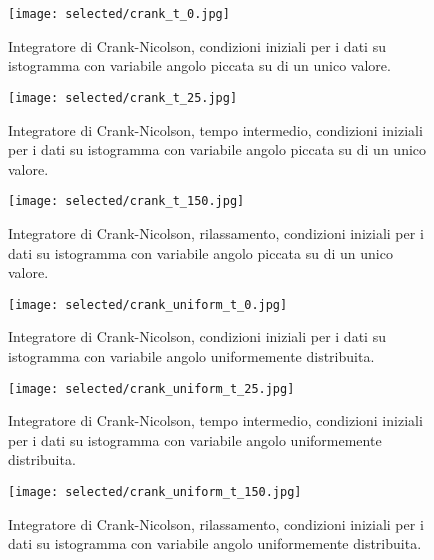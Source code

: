 \documentclass[10pt,a4paper]{article}
\begin{document}
\begin{figure}[p]
	\centering
	\texttt{[image: selected/crank\_t\_0.jpg]}
	\caption{Integratore di Crank-Nicolson, condizioni iniziali per i dati su istogramma con variabile angolo piccata su di un unico valore.}
	\label{fig:crank_1}
\end{figure}

\begin{figure}[p]
	\centering
	\texttt{[image: selected/crank\_t\_25.jpg]}
	\caption{Integratore di Crank-Nicolson, tempo intermedio, condizioni iniziali per i dati su istogramma con variabile angolo piccata su di un unico valore.}
	\label{fig:crank_2}
\end{figure}

\begin{figure}[p]
	\centering
	\texttt{[image: selected/crank\_t\_150.jpg]}
	\caption{Integratore di Crank-Nicolson, rilassamento, condizioni iniziali per i dati su istogramma con variabile angolo piccata su di un unico valore.}
	\label{fig:crank_3}
\end{figure}

\begin{figure}[p]
	\centering
	\texttt{[image: selected/crank\_uniform\_t\_0.jpg]}
	\caption{Integratore di Crank-Nicolson, condizioni iniziali per i dati su istogramma con variabile angolo uniformemente distribuita.}
	\label{fig:crank_4}
\end{figure}

\begin{figure}[p]
	\centering
	\texttt{[image: selected/crank\_uniform\_t\_25.jpg]}
	\caption{Integratore di Crank-Nicolson, tempo intermedio, condizioni iniziali per i dati su istogramma con variabile angolo uniformemente distribuita.}
	\label{fig:crank_5}
\end{figure}

\begin{figure}[p]
	\centering
	\texttt{[image: selected/crank\_uniform\_t\_150.jpg]}
	\caption{Integratore di Crank-Nicolson, rilassamento, condizioni iniziali per i dati su istogramma con variabile angolo uniformemente distribuita.}
	\label{fig:crank_6}
\end{figure}
\end{document}
